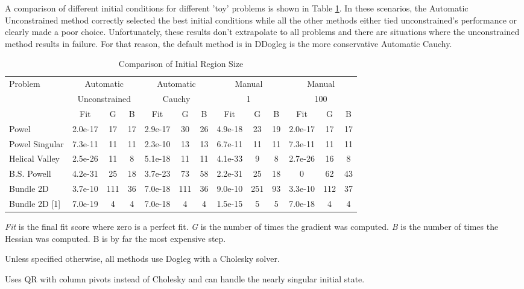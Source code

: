 \documentclass[peerreview,compsoc,onecolumn]{IEEEtran}
\begin{document}
A comparison of different initial conditions for different 'toy' problems is shown in Table \ref{results:initial_region}. In these scenarios, the Automatic Unconstrained method correctly selected the best initial conditions while all the other methods either tied unconstrained's performance or clearly made a poor choice. Unfortunately, these results don't extrapolate to all problems and there are situations where the unconstrained method results in failure. For that reason, the default method is in DDogleg is the more conservative Automatic Cauchy.

\begin{table}[h]
\centering
\begin{threeparttable}
\caption{\label{results:initial_region}Comparison of Initial Region Size}
\begin{tabular}{|l||c|c|c||c|c|c||c|c|c||c|c|c|}
\hline
Problem        & \multicolumn{3}{c||}{Automatic} & \multicolumn{3}{c||}{Automatic} & \multicolumn{3}{c||}{Manual} & \multicolumn{3}{c|}{Manual}\\
               & \multicolumn{3}{c||}{Unconstrained} & \multicolumn{3}{c||}{Cauchy} & \multicolumn{3}{c||}{1} & \multicolumn{3}{c|}{100} \\
\hline
               & Fit     & G  & B  & Fit     & G  & B   & Fit     & G  & B  & Fit     & G  & B\\
\hline
Powel          & 2.0e-17 & 17 & 17 & 2.9e-17 & 30 & 26  & 4.9e-18 & 23 & 19 & 2.0e-17 & 17 & 17 \\
Powel Singular & 7.3e-11 & 11 & 11 & 2.3e-10 & 13 & 13  & 6.7e-11 & 11 & 11 & 7.3e-11 & 11 & 11 \\
Helical Valley & 2.5e-26 & 11 & 8  & 5.1e-18 & 11 & 11  & 4.1e-33 & 9  & 8  & 2.7e-26 & 16 & 8\\
B.S. Powell    & 4.2e-31 & 25 & 18 & 3.7e-23 & 73 & 58  & 2.2e-31 & 25 & 18 & 0       & 62 & 43 \\
Bundle 2D      & 3.7e-10 & 111& 36 & 7.0e-18 & 111& 36  & 9.0e-10 & 251& 93 & 3.3e-10 & 112 & 37 \\
Bundle 2D [1]  & 7.0e-19 & 4  & 4  & 7.0e-18 & 4  & 4   & 1.5e-15 & 5  & 5  & 7.0e-18 & 4 & 4 \\ \hline
\end{tabular}
\begin{tablenotes}
\small
\item \emph{Fit} is the final fit score where zero is a perfect fit. \emph{G} is the number of times the gradient was computed. \emph{B} is the number of times the Hessian was computed. B is by far the most expensive step.
\item Unless specified otherwise, all methods use Dogleg with a Cholesky solver. 
\item [1] Uses QR with column pivots instead of Cholesky and can handle the nearly singular initial state.
\end{tablenotes}
\end{threeparttable}
\end{table}
\end{document}
